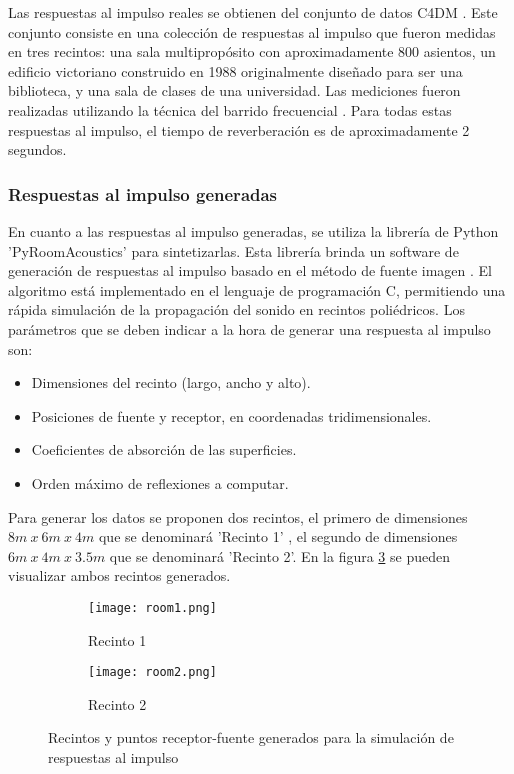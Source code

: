 Las respuestas al impulso reales se obtienen del conjunto de datos C4DM \cite{rir_reales}. Este conjunto consiste en una colección de respuestas al impulso que fueron medidas en tres recintos: una sala multipropósito con aproximadamente 800 asientos, un edificio victoriano construido en 1988 originalmente diseñado para ser una biblioteca, y una sala de clases de una universidad. Las mediciones fueron realizadas utilizando la técnica del barrido frecuencial \cite{sinesweep}. Para todas estas respuestas al impulso, el tiempo de reverberación es de aproximadamente 2 segundos. 

\subsubsection{Respuestas al impulso generadas}

En cuanto a las respuestas al impulso generadas, se utiliza la librería de Python 'PyRoomAcoustics' \cite{pyroom} para sintetizarlas. Esta librería brinda un software de generación de respuestas al impulso basado en el método de fuente imagen  \cite{ISM}. El algoritmo está implementado en el lenguaje de programación C, permitiendo una rápida simulación de la propagación del sonido en recintos poliédricos. Los parámetros que se deben indicar a la hora de generar una respuesta al impulso son: 

\begin{itemize}
\item Dimensiones del recinto (largo, ancho y alto).
\item Posiciones de fuente y receptor, en coordenadas tridimensionales.
\item Coeficientes de absorción de las superficies.
\item Orden máximo de reflexiones a computar.
\end{itemize} 

Para generar los datos se proponen dos recintos, el primero de dimensiones $8m\: x\: 6m\: x\: 4m$ que se denominará 'Recinto 1' , el segundo de dimensiones $6m\: x\: 4m\: x\: 3.5m$ que se denominará 'Recinto 2'. En la figura \ref{fig:recintos} se pueden visualizar ambos recintos generados. 

\begin{figure}[H]
\centering
\begin{subfigure}{.5\textwidth}
  \centering
  \texttt{[image: room1.png]}
  \caption{Recinto 1}
  \label{fig:sub1}
\end{subfigure}%
\begin{subfigure}{.5\textwidth}
  \centering
  \texttt{[image: room2.png]}
  \caption{Recinto 2}
  \label{fig:sub2}
\end{subfigure}
\caption{Recintos y puntos receptor-fuente generados para la simulación de respuestas al impulso}
\label{fig:recintos}
\end{figure}


